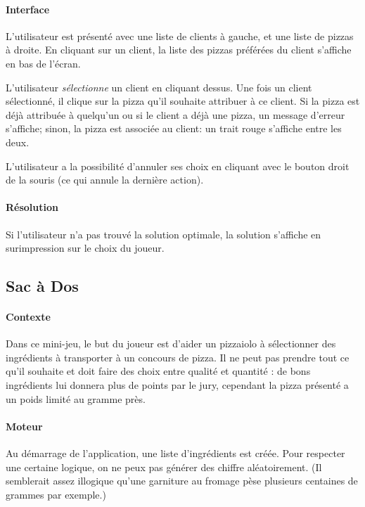 		\paragraph{Interface}
			L'utilisateur est présenté avec une liste de clients à gauche, et une liste
			 de pizzas à droite. En cliquant sur un client, la liste des pizzas préférées
			 du client s'affiche en bas de l'écran.

			L'utilisateur \emph{sélectionne} un client en cliquant dessus. Une fois un client
			 sélectionné, il clique sur la pizza qu'il souhaite attribuer à ce client. Si la
			 pizza est déjà attribuée à quelqu'un ou si le client a déjà une pizza, un message
			 d'erreur s'affiche; sinon, la pizza est associée au client: un trait rouge
			 s'affiche entre les deux.

			L'utilisateur a la possibilité d'annuler ses choix en cliquant avec le bouton
			 droit de la souris (ce qui annule la dernière action).
		\paragraph{Résolution}
			Si l'utilisateur n'a pas trouvé la solution optimale, la solution s'affiche
			 en surimpression sur le choix du joueur.

    \subsection{Sac à Dos}
        \paragraph{Contexte}
            Dans ce mini-jeu, le but du joueur est d'aider un pizzaiolo à
            sélectionner des ingrédients à transporter à un concours de pizza.
            Il ne peut pas prendre tout ce qu'il souhaite et doit faire des
            choix entre qualité et quantité : de bons ingrédients lui donnera
            plus de points par le jury, cependant la pizza présenté a un poids
            limité au gramme près.
        \paragraph{Moteur}
            Au démarrage de l'application, une liste d'ingrédients est créée.
            Pour respecter une certaine logique, on ne peux pas générer des
            chiffre aléatoirement. (Il semblerait assez illogique qu'une
            garniture au fromage pèse plusieurs centaines de grammes par
            exemple.)
